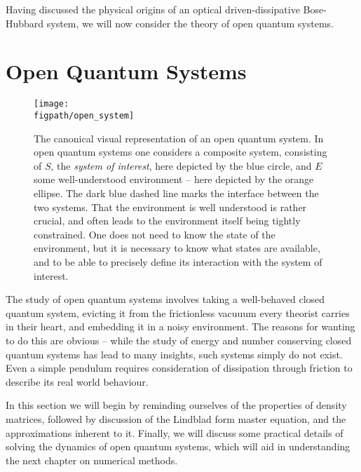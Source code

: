 Having discussed the physical origins of an optical driven-dissipative Bose-Hubbard system, we will now consider the theory of open quantum systems.

\section{Open Quantum Systems}

\begin{figure}[ht!]
\centering
\texttt{[image: \\figpath/open\_system]}
\caption{The canonical visual representation of an open quantum system. In open quantum systems one considers a composite system, consisting of \(S\), the \emph{system of interest}, here depicted by the blue circle, and \(E\) some well-understood environment -- here depicted by the orange ellipse. The dark blue dashed line marks the interface between the two systems. That the environment is well understood is rather crucial, and often leads to the environment itself being tightly constrained. One does not need to know the state of the environment, but it is necessary to know what states are available, and to be able to precisely define its interaction with the system of interest.}
\label{fig:oqs1-1}
\end{figure}

The study of open quantum systems involves taking a well-behaved closed quantum system, evicting it from the frictionless vacuuum every theorist carries in their heart, and embedding it in a noisy environment. The reasons for wanting to do this are obvious -- while the study of energy and number conserving closed quantum systems has lead to many insights, such systems simply do not exist. Even a simple pendulum requires consideration of dissipation through friction to describe its real world behaviour.  

In this section we will begin by reminding ourselves of the properties of density matrices, followed by discussion of the Lindblad form master equation, and the approximations inherent to it. Finally, we will discuss some practical details of solving the dynamics of open quantum systems, which will aid in understanding the next chapter on numerical methods.

